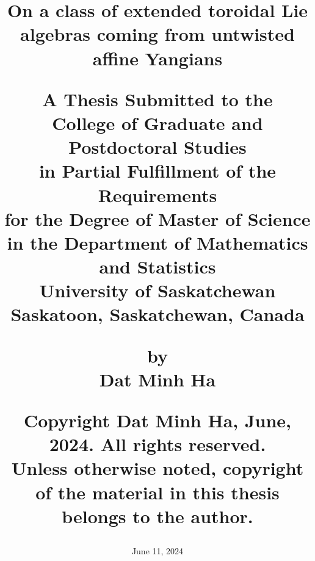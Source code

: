 \title{
    \texorpdfstring{\Huge On a class of extended toroidal Lie algebras coming from untwisted affine Yangians}

    \vfill

    \begin{centering}
        \normalsize A Thesis Submitted to the
        \\
        College of Graduate and Postdoctoral Studies
        \\
        in Partial Fulfillment of the Requirements
        \\
        for the Degree of Master of Science
        \\
        in the Department of Mathematics and Statistics
        \\
        University of Saskatchewan
        \\
        Saskatoon, Saskatchewan, Canada
    \end{centering}

    \vfill

    \begin{centering}
        \normalsize by
        \\
        Dat Minh Ha
    \end{centering}

    \vfill

    \begin{centering}
        \normalsize \textcopyright Copyright Dat Minh Ha, June, 2024. All rights reserved.
        \\
        Unless otherwise noted, copyright of the material in this thesis belongs to the author.
        \\
        \date{\normalsize June 11, 2024}
    \end{centering}
    
}

\maketitle